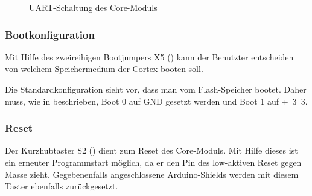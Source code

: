 \begin{figure}[H]
    \centering
    \qquad
    \qquad
    \caption[UART-Schaltung des Core-Moduls]{UART-Schaltung des \gls{Core-Modul}s}
    \label{fig:coremodul-uart}
\end{figure}

\subsubsection{Bootkonfiguration}
Mit Hilfe des zweireihigen Bootjumpers X5 () kann der Benutzter entscheiden von welchem Speichermedium der Cortex booten soll.

Die Standardkonfiguration sieht vor, dass man vom Flash-Speicher bootet. Daher muss, wie in  beschrieben, Boot 0 auf GND gesetzt werden und Boot 1 auf \unit{+3.3}{\volt}.


\subsubsection{Reset}
Der Kurzhubtaster S2 () dient zum Reset des \gls{Core-Modul}s. Mit Hilfe dieses ist ein erneuter Programmstart möglich, da er den Pin des low-aktiven Reset gegen Masse zieht. Gegebenenfalls angeschlossene Arduino-Shields werden mit diesem Taster ebenfalls zurückgesetzt.

